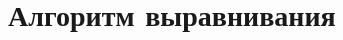 \newpage

\section[Алгоритм выравнивания]{\large \centering Алгоритм выравнивания}
\hspace{\parindent}  
